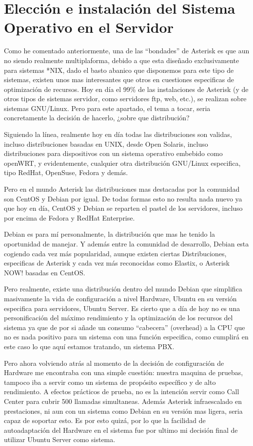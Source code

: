 \section{Elección e instalación del Sistema Operativo en el Servidor}

Como he comentado anteriormente, una de las “bondades” de Asterisk es que aun no siendo realmente multiplaforma, debido a que esta diseñado exclusivamente para sistemas *NIX, dado el basto abanico que disponemos para este tipo de sistemas, existen unos mas interesantes que otros en cuestiones especificas de optimización de recursos. Hoy en día el 99\% de las instalaciones de Asterisk (y de otros tipos de sistemas servidor, como servidores ftp, web, etc.), se realizan sobre sistemas GNU/Linux. Pero para este apartado, el tema a tocar, seria concretamente la decisión de hacerlo, ¿sobre que distribución?

Siguiendo la línea, realmente hoy en día todas las distribuciones son validas, incluso distribuciones basadas en UNIX, desde Open Solaris, incluso distribuciones para dispositivos con un sistema operativo embebido como openWRT, y evidentemente, cualquier otra distribución GNU/Linux especifica, tipo RedHat, OpenSuse, Fedora y demás.

Pero en el mundo Asterisk las distribuciones mas destacadas por la comunidad son CentOS y Debian por igual. De todas formas esto no resulta nada nuevo ya que hoy en día, CentOS y Debian se reparten el pastel de los servidores, incluso por encima de Fedora y RedHat Enterprise.

Debian es para mí personalmente, la distribución que mas he tenido la oportunidad de manejar. Y además entre la comunidad de desarrollo, Debian esta cogiendo cada vez más popularidad, aunque existen ciertas Distribuciones, especificas de Asterisk y cada vez más reconocidas como Elastix, o Asterisk NOW! basadas en CentOS. 

Pero realmente, existe una distribución dentro del mundo Debian que simplifica masivamente la vida de configuración a nivel Hardware, Ubuntu en su versión especifica para servidores, Ubuntu Server. Es cierto que a día de hoy no es una personificación del máximo rendimiento y la optimización de los recursos del sistema ya que de por si añade un consumo “cabecera” (overhead) a la CPU que no es nada positivo para un sistema con una función especifica, como cumplirá en este caso lo que aquí estamos tratando, un sistema PBX.

Pero ahora volviendo atrás al momento de la decisión de configuración de Hardware me encontraba con una simple cuestión: nuestra maquina de pruebas, tampoco iba a servir como un sistema de propósito específico y de alto rendimiento. A efectos prácticos de prueba, no es la intención servir como Call Center para cubrir 500 llamadas simultaneas. Además Asterisk infraescalado en prestaciones, ni aun con un sistema como Debian en su versión mas ligera, seria capaz de soportar esto. Es por esto quizá, por lo que la facilidad de autoadaptación del Hardware en el sistema fue por ultimo mi decisión final de utilizar Ubuntu Server como sistema.

